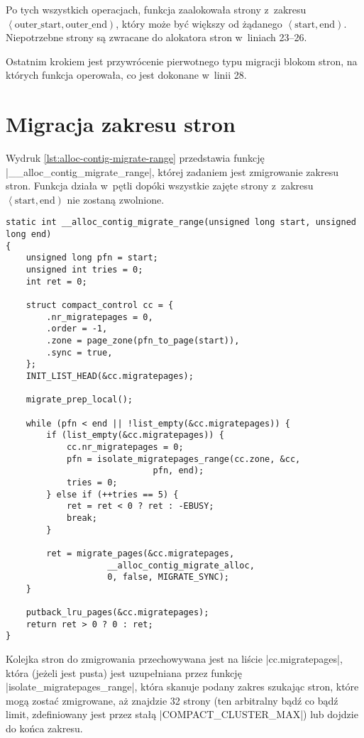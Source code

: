 Po tych wszystkich operacjach, funkcja zaalokowała strony z~zakresu
$\left<\mathrm{outer\_start}, \mathrm{outer\_end}\right)$, który może
być większy od żądanego $\left<\mathrm{start}, \mathrm{end}\right)$.
Niepotrzebne strony są zwracane do alokatora stron w~liniach 23--26.

Ostatnim krokiem jest przywrócenie pierwotnego typu migracji blokom
stron, na których funkcja operowała, co jest dokonane w~linii 28.


\section{Migracja zakresu stron}\label{sec:alloc-contig-migrate-range}


Wydruk \ref{lst:alloc-contig-migrate-range} przedstawia funkcję
\code|__alloc_contig_migrate_range|, której zadaniem jest zmigrowanie
zakresu stron.  Funkcja działa w~pętli dopóki wszystkie zajęte strony
z~zakresu $\left<\mathrm{start}, \mathrm{end}\right)$ nie zostaną
zwolnione.


\begin{lstlisting}[float=tb,caption={Skrócony wydruk funkcji
    \code|__alloc_conting_migrate_range| z Linuksa 3.5.},label=lst:alloc-contig-migrate-range]
static int __alloc_contig_migrate_range(unsigned long start, unsigned long end)
{
	unsigned long pfn = start;
	unsigned int tries = 0;
	int ret = 0;

	struct compact_control cc = {
		.nr_migratepages = 0,
		.order = -1,
		.zone = page_zone(pfn_to_page(start)),
		.sync = true,
	};
	INIT_LIST_HEAD(&cc.migratepages);

	migrate_prep_local();

	while (pfn < end || !list_empty(&cc.migratepages)) {
		if (list_empty(&cc.migratepages)) {
			cc.nr_migratepages = 0;
			pfn = isolate_migratepages_range(cc.zone, &cc,
							 pfn, end);
			tries = 0;
		} else if (++tries == 5) {
			ret = ret < 0 ? ret : -EBUSY;
			break;
		}

		ret = migrate_pages(&cc.migratepages,
				    __alloc_contig_migrate_alloc,
				    0, false, MIGRATE_SYNC);
	}

	putback_lru_pages(&cc.migratepages);
	return ret > 0 ? 0 : ret;
}
\end{lstlisting}

Kolejka stron do zmigrowania przechowywana jest na liście
\code|cc.migratepages|, która (jeżeli jest pusta) jest uzupełniana
przez funkcję \code|isolate_migratepages_range|, która skanuje podany
zakres szukając stron, które mogą zostać zmigrowane, aż znajdzie 32
strony (ten arbitralny bądź co bądź limit, zdefiniowany jest przez
stałą \code|COMPACT_CLUSTER_MAX|) lub dojdzie do końca zakresu.

